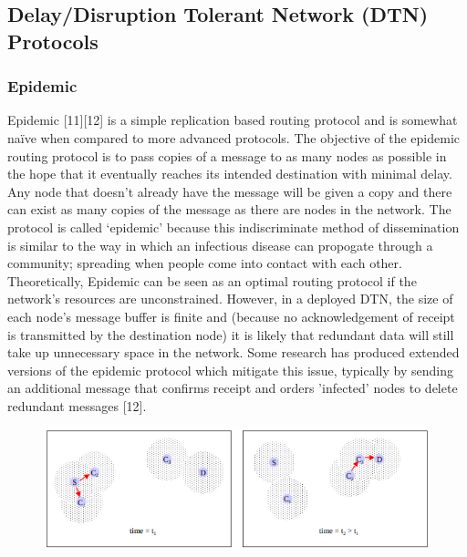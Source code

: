 \documentclass{article}
\begin{document}
\subsection{Delay/Disruption Tolerant Network (DTN) Protocols}
\subsubsection{Epidemic}
Epidemic [11][12] is a simple replication based routing protocol and is somewhat naïve when compared to more advanced protocols. The objective of the epidemic routing protocol is to pass copies of a message to as many nodes as possible in the hope that it eventually reaches its intended destination with minimal delay. Any node that doesn't already have the message will be given a copy and there can exist as many copies of the message as there are nodes in the network. The protocol is called `epidemic' because this indiscriminate method of dissemination is similar to the way in which an infectious disease can propogate through a community; spreading when people come into contact with each other.\\
\newline Theoretically, Epidemic can be seen as an optimal routing protocol if the network's resources are unconstrained. However, in a deployed DTN, the size of each node's message buffer is finite and (because no acknowledgement of receipt is transmitted by the destination node) it is likely that redundant data will still take up unnecessary space in the network. Some research has produced extended versions of the epidemic protocol which mitigate this issue, typically by sending an additional message that confirms receipt and orders 'infected' nodes to delete redundant messages [12].

\begin{figure}[h!]
\captionsetup{justification=centering, font=footnotesize}
\centering
  \includegraphics[width=.98\linewidth]{Screenshots/Epidemic.png}
  \label{fig:test1}
\end{figure}
\end{document}
